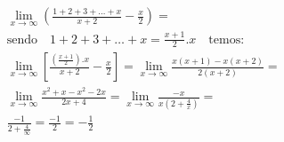 \begin{ex}
\begin{align}
&\lim_{x\rightarrow \infty} \left(\frac{1+2+3+\dots+x}{x+2}-\frac{x}{2}\right)=\nonumber\\
&\text{sendo}\quad 1+2+3+\dots+x=\frac{x+1}{2}.x\quad\text{temos:}\nonumber\\
&\lim_{x\rightarrow \infty} \left[\frac{\left(\frac{x+1}{2}\right).x}{x+2}-\frac{x}{2}\right]=\lim_{x\rightarrow \infty} \frac{x(x+1)-x(x+2)}{2(x+2)}=\nonumber\\
&\lim_{x\rightarrow \infty} \frac{x^2+x-x^2-2x}{2x+4}=\lim_{x\rightarrow \infty} \frac{-x}{x\left(2+\frac{4}{x}\right)}=\nonumber\\
&\frac{-1}{2+\frac{4}{\infty}}=\frac{-1}{2}=-\frac{1}{2}\nonumber
\end{align}
\end{ex}
